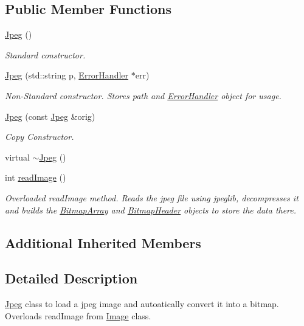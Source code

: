 \subsection*{Public Member Functions}
\begin{DoxyCompactItemize}
\item 
\mbox{\hyperlink{classJpeg_aa6712899740d8d3d8789efe83aeeffac}{Jpeg}} ()
\begin{DoxyCompactList}\small\item\em Standard constructor. \end{DoxyCompactList}\item 
\mbox{\hyperlink{classJpeg_a8c226ee5074c5058b96b918b99e4a531}{Jpeg}} (std\+::string p, \mbox{\hyperlink{classErrorHandler}{Error\+Handler}} $\ast$err)
\begin{DoxyCompactList}\small\item\em Non-\/\+Standard constructor. Stores path and \mbox{\hyperlink{classErrorHandler}{Error\+Handler}} object for usage. \end{DoxyCompactList}\item 
\mbox{\hyperlink{classJpeg_abc02dc366057e25e538b8c76c5463554}{Jpeg}} (const \mbox{\hyperlink{classJpeg}{Jpeg}} \&orig)
\begin{DoxyCompactList}\small\item\em Copy Constructor. \end{DoxyCompactList}\item 
virtual \mbox{\hyperlink{classJpeg_aa03b879cc5185f52c4c9e39faf03db85}{$\sim$\+Jpeg}} ()
\item 
int \mbox{\hyperlink{classJpeg_a80db9e22efc544e32145b6743b2b407c}{read\+Image}} ()
\begin{DoxyCompactList}\small\item\em Overloaded read\+Image method. Reads the jpeg file using jpeglib, decompresses it and builds the \mbox{\hyperlink{classBitmapArray}{Bitmap\+Array}} and \mbox{\hyperlink{classBitmapHeader}{Bitmap\+Header}} objects to store the data there. \end{DoxyCompactList}\end{DoxyCompactItemize}
\subsection*{Additional Inherited Members}


\subsection{Detailed Description}
\mbox{\hyperlink{classJpeg}{Jpeg}} class to load a jpeg image and autoatically convert it into a bitmap. Overloads read\+Image from \mbox{\hyperlink{classImage}{Image}} class. 

